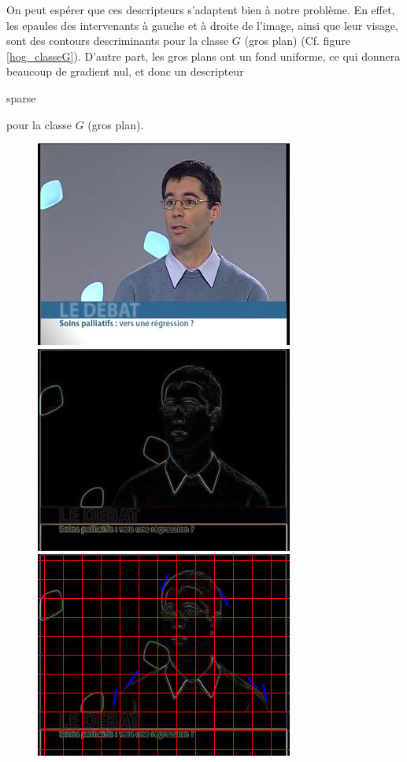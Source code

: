 \documentclass{book}
\begin{document}
On peut espérer que ces descripteurs s'adaptent bien à notre problème. En effet, les epaules des intervenants à gauche 
et à droite de l'image, ainsi que leur visage, sont des contours descriminants pour la classe $G$ (gros plan)
(Cf. figure \ref{hog_classeG}). D'autre part, les gros plans ont un fond uniforme, 
ce qui donnera beaucoup de gradient nul, et donc un descripteur \begin{itshape}sparse\end{itshape} pour la classe $G$ (gros plan).

\begin{figure}[H]
\begin{center}
\includegraphics[scale=0.3]{hog_exemple.jpg}
\includegraphics[scale=0.3]{hog_exemple_contour.jpg}
\includegraphics[scale=0.3]{hog_exemple_gradient.jpg}

\end{center}
\end{figure}
\end{document}
